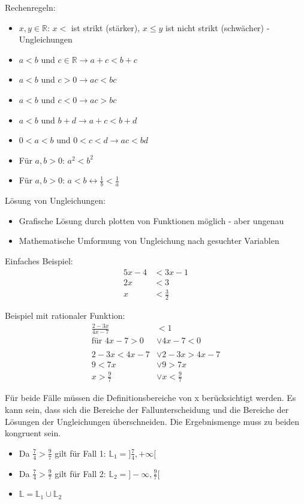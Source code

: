 \documentclass{standalone}
\begin{document}
 

Rechenregeln:
\begin{itemize}
    \item $x,y \in \mathbb{R}$: $x < $ ist strikt (stärker), $ x \leq y$ ist nicht strikt (schwächer) - Ungleichungen
    \item $a < b$ und $c \in \mathbb{R} \rightarrow a+c < b+c$ 
    \item $a < b$ und $c > 0 \rightarrow ac < bc$
    \item $a<b$ und $c<0 \rightarrow ac > bc$
    \item $a<b$ und $b+d \rightarrow a+c < b+d$
    \item $0<a<b$ und $0<c<d \rightarrow ac < bd$
    \item Für $a,b > 0$: $a^2 < b^2$
    \item Für $a,b > 0$: $a<b \leftrightarrow \frac{1}{b} < \frac{1}{a}$
\end{itemize}

Lösung von Ungleichungen:
\begin{itemize}
    \item Grafische Lösung durch plotten von Funktionen möglich - aber ungenau
    \item Mathematische Umformung von Ungleichung nach gesuchter Variablen
\end{itemize}
Einfaches Beispiel:
\begin{align}
    5x -4 &< 3x-1 \\
    2x &< 3 \\
    x &< \frac{3}{2}
\end{align}

Beispiel mit rationaler Funktion:
\begin{align}
    \frac{2-3x}{4x-7} &<1 \\
    \text{für } 4x-7 > 0 &\vee 4x-7 < 0 \\
    & \\
    2-3x < 4x-7 &\vee 2-3x > 4x-7 \\
    9 < 7x &\vee 9 > 7x \\
    x > \frac{9}{7}  &\vee x < \frac{9}{7}
\end{align}

Für beide Fälle müssen die Definitionsbereiche von x berücksichtigt werden. Es kann sein, dass sich die Bereiche der Fallunterscheidung und die Bereiche der Lösungen der Ungleichungen überschneiden. Die Ergebnismenge muss zu beiden kongruent sein.
\begin{itemize}
    \item Da $\frac{7}{4} > \frac{9}{7}$ gilt für Fall 1: $\mathbb{L}_1=]\frac{7}{4},+\infty[$
    \item Da $\frac{7}{4} > \frac{9}{7}$ gilt für Fall 2: $\mathbb{L}_2=]-\infty, \frac{9}{7}[$
    \item $\mathbb{L} = \mathbb{L}_1 \cup \mathbb{L}_2$
\end{itemize}
\end{document}
